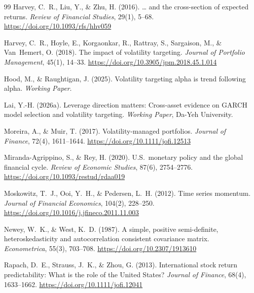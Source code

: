 \begin{thebibliography}{99}
Harvey, C.~R., Liu, Y., \& Zhu, H. (2016). \ldots{} and the cross-section of expected returns. \textit{Review of Financial Studies}, 29(1), 5--68. \url{https://doi.org/10.1093/rfs/hhv059}

Harvey, C.~R., Hoyle, E., Korgaonkar, R., Rattray, S., Sargaison, M., \& Van~Hemert, O. (2018). The impact of volatility targeting. \textit{Journal of Portfolio Management}, 45(1), 14--33. \url{https://doi.org/10.3905/jpm.2018.45.1.014}

Hood, M., \& Raughtigan, J. (2025). Volatility targeting alpha is trend following alpha. \textit{Working Paper}.

Lai, Y.-H. (2026a). Leverage direction matters: Cross-asset evidence on GARCH model selection and volatility targeting. \textit{Working Paper}, Da-Yeh University.

Moreira, A., \& Muir, T. (2017). Volatility-managed portfolios. \textit{Journal of Finance}, 72(4), 1611--1644. \url{https://doi.org/10.1111/jofi.12513}

Miranda-Agrippino, S., \& Rey, H. (2020). U.S.\ monetary policy and the global financial cycle. \textit{Review of Economic Studies}, 87(6), 2754--2776. \url{https://doi.org/10.1093/restud/rdaa019}

Moskowitz, T.~J., Ooi, Y.~H., \& Pedersen, L.~H. (2012). Time series momentum. \textit{Journal of Financial Economics}, 104(2), 228--250. \url{https://doi.org/10.1016/j.jfineco.2011.11.003}

Newey, W.~K., \& West, K.~D. (1987). A simple, positive semi-definite, heteroskedasticity and autocorrelation consistent covariance matrix. \textit{Econometrica}, 55(3), 703--708. \url{https://doi.org/10.2307/1913610}

Rapach, D.~E., Strauss, J.~K., \& Zhou, G. (2013). International stock return predictability: What is the role of the United States? \textit{Journal of Finance}, 68(4), 1633--1662. \url{https://doi.org/10.1111/jofi.12041}

\end{thebibliography}
